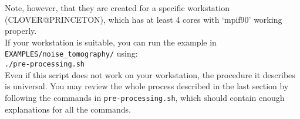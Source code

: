 Note, however, that they are created for a specific workstation (CLOVER@PRINCETON),
which has at least 4 cores with `mpif90' working properly. \\


If your workstation is suitable, you can run the example in \texttt{EXAMPLES/noise\_tomography/}
using:\\


\texttt{./pre-processing.sh}\\


Even if this script does not work on your workstation, the procedure
it describes is universal. You may review the whole process described
in the last section by following the commands in \texttt{pre-processing.sh},
which should contain enough explanations for all the commands.

